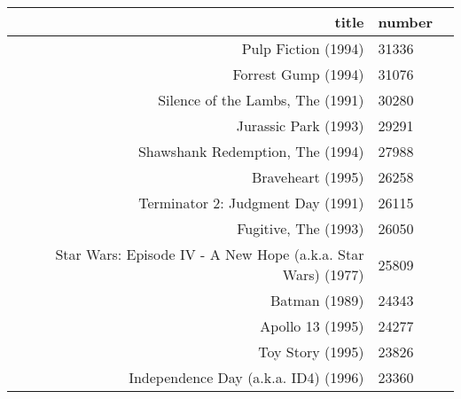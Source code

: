 \documentclass[11pt]{article}
\begin{document}
    \begin{tabular}{r|ll}
 title & number\\
\hline
	 Pulp Fiction (1994)                                                            & 31336                                                                         \\
	 Forrest Gump (1994)                                                            & 31076                                                                         \\
	 Silence of the Lambs, The (1991)                                               & 30280                                                                         \\
	 Jurassic Park (1993)                                                           & 29291                                                                         \\
	 Shawshank Redemption, The (1994)                                               & 27988                                                                         \\
	 Braveheart (1995)                                                              & 26258                                                                         \\
	 Terminator 2: Judgment Day (1991)                                              & 26115                                                                         \\
	 Fugitive, The (1993)                                                           & 26050                                                                         \\
	 Star Wars: Episode IV - A New Hope (a.k.a. Star Wars) (1977)                   & 25809                                                                         \\
	 Batman (1989)                                                                  & 24343                                                                         \\
	 Apollo 13 (1995)                                                               & 24277                                                                         \\
	 Toy Story (1995)                                                               & 23826                                                                         \\
	 Independence Day (a.k.a. ID4) (1996)                                           & 23360                                                                         \\

\end{tabular}
\end{document}
